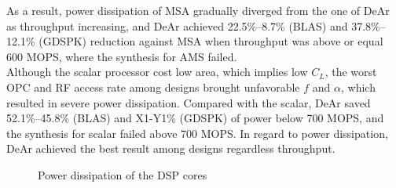 {    As a result, power dissipation of MSA gradually diverged from the one of DeAr as throughput increasing, 
    and DeAr achieved 22.5\%--8.7\% (BLAS) and 37.8\%--12.1\% (GDSPK) reduction against MSA when throughput was above or equal 600 MOPS, 
    where the synthesis for AMS failed.
    \\\indent
    Although the scalar processor cost low area, which implies low $C_L$, 
    the worst OPC and RF access rate among designs brought unfavorable $f$ and $\alpha$, 
    which resulted in severe power dissipation. 
    Compared with the scalar, DeAr saved 52.1\%--45.8\% (BLAS) and X1-Y1\% (GDSPK) of power below 700 MOPS, 
    and the synthesis for scalar failed above 700 MOPS.
    In regard to power dissipation, DeAr achieved the best result among designs regardless throughput.
    \vspace{\textfig}
    \begin{figure}[!ht]
        \begin{center}
        \end{center}
        \caption{Power dissipation of the DSP cores}
        \label{chart:area}
    \end{figure}

}


